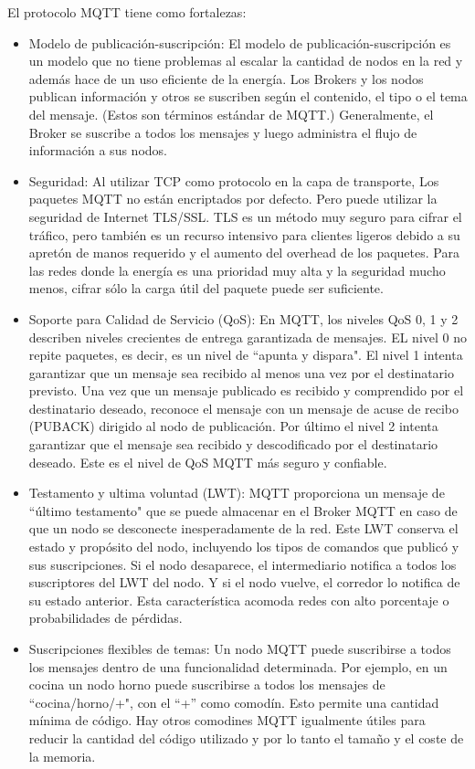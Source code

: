 El protocolo MQTT tiene como fortalezas:
\begin{itemize}
\item Modelo de publicación-suscripción: El modelo de publicación-suscripción es un modelo que no tiene problemas al escalar la cantidad de nodos en la red y además hace de un uso eficiente de la energía. Los Brokers y los nodos publican información y otros se suscriben según el contenido, el tipo o el tema del mensaje. (Estos son términos estándar de MQTT.) Generalmente, el Broker se suscribe a todos los mensajes y luego administra el flujo de información a sus nodos.
\item Seguridad: Al utilizar TCP como protocolo en la capa de transporte, Los paquetes MQTT no están encriptados por defecto. Pero puede utilizar la seguridad de Internet TLS/SSL\cite{rfc9431}. TLS es un método muy seguro para cifrar el tráfico, pero también es un recurso intensivo para clientes ligeros debido a su apretón de manos requerido y el aumento del overhead de los paquetes. Para las redes donde la energía es una prioridad muy alta y la seguridad mucho menos, cifrar sólo la carga útil del paquete puede ser suficiente.
\item Soporte para Calidad de Servicio (QoS): En MQTT, los niveles QoS 0, 1 y 2 describen niveles crecientes de entrega garantizada de mensajes. EL nivel 0 no repite paquetes, es decir, es un nivel de ``apunta y dispara". El nivel 1 intenta garantizar que un mensaje sea recibido al menos una vez por el destinatario previsto. Una vez que un mensaje publicado es recibido y comprendido por el destinatario deseado, reconoce el mensaje con un mensaje de acuse de recibo (PUBACK) dirigido al nodo de publicación. Por último el nivel 2 intenta garantizar que el mensaje sea recibido y descodificado por el destinatario deseado. Este es el nivel de QoS MQTT más seguro y confiable. 
\item Testamento y ultima voluntad (LWT): MQTT proporciona un mensaje de ``último testamento" que se puede almacenar en el Broker MQTT en caso de que un nodo se desconecte inesperadamente de la red. Este LWT conserva el estado y propósito del nodo, incluyendo los tipos de comandos que publicó y sus suscripciones. Si el nodo desaparece, el intermediario notifica a todos los suscriptores del LWT del nodo. Y si el nodo vuelve, el corredor lo notifica de su estado anterior. Esta característica acomoda redes con alto porcentaje o probabilidades de  pérdidas.
\item Suscripciones flexibles de temas: Un nodo MQTT puede suscribirse a todos los mensajes dentro de una funcionalidad determinada. Por ejemplo, en un cocina un nodo horno puede suscribirse a todos los mensajes de ``cocina/horno/+", con el ``+'' como comodín. Esto permite una cantidad mínima de código. Hay otros comodines MQTT igualmente útiles para reducir la cantidad del código utilizado y por lo tanto el tamaño y el coste de la memoria.
\end{itemize}

